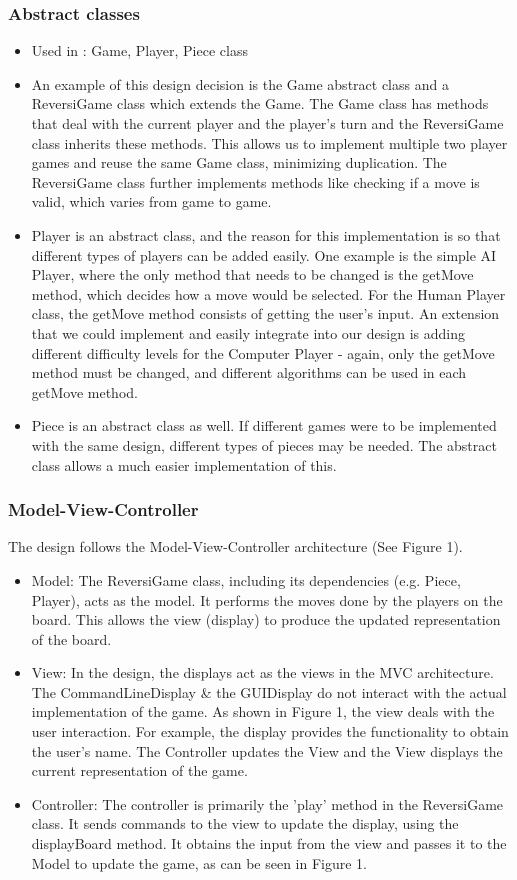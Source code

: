 \documentclass[english]{article}
\begin{document}
\subsubsection{Abstract classes}
\begin{itemize}
\item Used in : Game, Player, Piece class
\item An example of this design decision is the Game abstract class and
a ReversiGame class which extends the Game. The Game class has methods
that deal with the current player and the player's turn and the ReversiGame
class inherits these methods. This allows us to implement multiple
two player games and reuse the same Game class, minimizing duplication.
The ReversiGame class further implements methods like checking if
a move is valid, which varies from game to game.
\item Player is an abstract class, and the reason for this implementation
is so that different types of players can be added easily. One example
is the simple AI Player, where the only method that needs to be changed
is the getMove method, which decides how a move would be selected.
For the Human Player class, the getMove method consists of getting
the user's input. An extension that we could implement and easily
integrate into our design is adding different difficulty levels for
the Computer Player - again, only the getMove method must be changed,
and different algorithms can be used in each getMove method.
\item Piece is an abstract class as well. If different games were to be
implemented with the same design, different types of pieces may be
needed. The abstract class allows a much easier implementation of
this.
\end{itemize}

\subsubsection{Model-View-Controller}

The design follows the Model-View-Controller architecture (See Figure
1).
\begin{itemize}
\item Model: The ReversiGame class, including its dependencies (e.g. Piece,
Player), acts as the model. It performs the moves done by the players
on the board. This allows the view (display) to produce the updated
representation of the board. 
\item View: In the design, the displays act as the views in the MVC architecture.
The CommandLineDisplay \& the GUIDisplay do not interact with the
actual implementation of the game. As shown in Figure 1, the view
deals with the user interaction. For example, the display provides
the functionality to obtain the user's name. The Controller updates
the View and the View displays the current representation of the game.
\item Controller: The controller is primarily the 'play' method in the ReversiGame
class. It sends commands to the view to update the display, using
the displayBoard method. It obtains the input from the view and passes
it to the Model to update the game, as can be seen in Figure 1.
\end{itemize}
\end{document}
